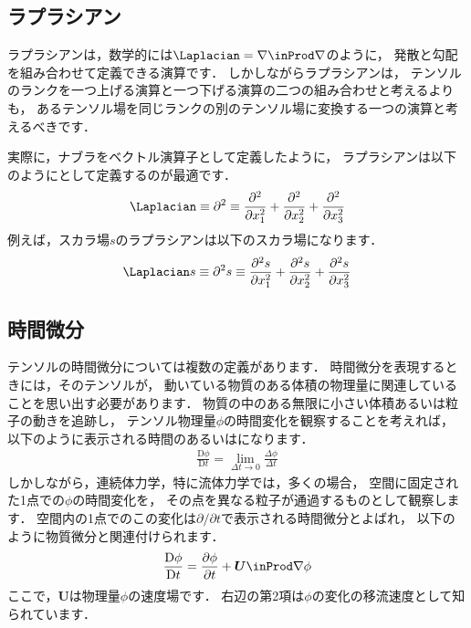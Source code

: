 \subsection{ラプラシアン}
\label{ssec:2.1.4}
ラプラシアンは，数学的には$\Laplacian = \nabla \inProd \nabla$のように，
発散と勾配を組み合わせて定義できる演算です．
しかしながらラプラシアンは，
テンソルのランクを一つ上げる演算と一つ下げる演算の二つの組み合わせと考えるよりも，
あるテンソル場を同じランクの別のテンソル場に変換する一つの演算と考えるべきです．

実際に，ナブラをベクトル演算子として定義したように，
ラプラシアンは以下のようにとして定義するのが最適です．
\begin{align}
 \label{eq:2.8}
 \Laplacian \equiv \partial^{2} \equiv
 \frac{\partial^{2}}{\partial x_{1}^{2}}
 + \frac{\partial^{2}}{\partial x_{2}^{2}}
 + \frac{\partial^{2}}{\partial x_{3}^{2}}
\end{align}
例えば，スカラ場$s$のラプラシアンは以下のスカラ場になります．
\begin{align}
 \label{eq:2.9}
 \Laplacian s \equiv \partial^{2}s \equiv
 \frac{\partial^{2}s}{\partial x_{1}^{2}}
 + \frac{\partial^{2}s}{\partial x_{2}^{2}}
 + \frac{\partial^{2}s}{\partial x_{3}^{2}}
\end{align}


\subsection{時間微分}
\label{ssec:2.1.5}
テンソルの時間微分については複数の定義があります．
時間微分を表現するときには，そのテンソルが，
動いている物質のある体積の物理量に関連していることを思い出す必要があります．
物質の中のある無限に小さい体積あるいは粒子の動きを追跡し，
テンソル物理量$\phi$の時間変化を観察することを考えれば，
以下のように表示される時間のあるいはになります．
\begin{align}
 \label{eq:2.10}
 \frac{\mathrm{D}\phi}{\mathrm{D}t} = \lim_{\Delta t \to 0}\frac{\Delta\phi}{\Delta t}
\end{align}
しかしながら，連続体力学，特に流体力学では，多くの場合，
空間に固定された1点での$\phi$の時間変化を，
その点を異なる粒子が通過するものとして観察します．
空間内の1点でのこの変化は$\partial / \partial t$で表示される時間微分とよばれ，
以下のように物質微分と関連付けられます．
\begin{align}
 \label{eq:2.11}
 \frac{\mathrm{D}\phi}{\mathrm{D}t}
 = \frac{\partial\phi}{\partial t} + \bm{U} \inProd \nabla\phi
\end{align}
ここで，$\bm{U}$は物理量$\phi$の速度場です．
右辺の第2項は$\phi$の変化の移流速度として知られています．



